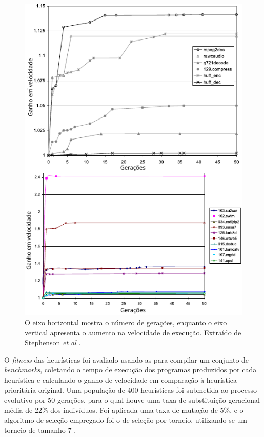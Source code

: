 \documentclass[
	12pt,				%
	openright,			%
	twoside,			%
	a4paper,			%
	tcc,			%
	]{ABNT-DC-UEL}
\begin{document}
\begin{figure}[hbt]
    \centering
    \includegraphics[scale=1.4]{stephenson-resultados}
    \caption{O eixo horizontal mostra o número de gerações, enquanto o eixo vertical apresenta o aumento na velocidade de execução. Extraído de Stephenson \textit{et al} \cite{amarasinghe:03}.}
    \label{fig:stephenson-resultados}
\end{figure}

O \textit{fitness} das heurísticas foi avaliado usando-as para compilar um conjunto de \textit{benchmarks}, coletando o tempo de execução dos programas produzidos por cada heurística e calculando o ganho de velocidade em comparação à heurística prioritária original. Uma população de 400 heurísticas foi submetida ao processo evolutivo por 50 gerações, para o qual houve uma taxa de substituição geracional média de 22\% dos indivíduos. Foi aplicada uma taxa de mutação de 5\%, e o algoritmo de seleção empregado foi o de seleção por torneio, utilizando-se um torneio de tamanho 7 \cite{stephenson:06}.
\end{document}
